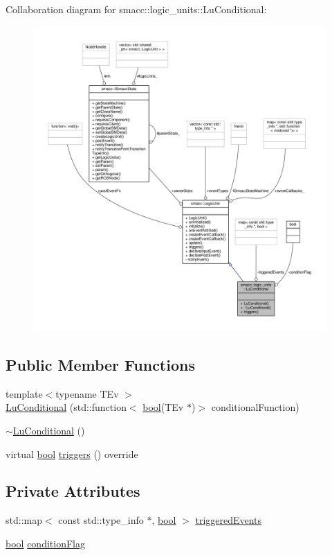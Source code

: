 Collaboration diagram for smacc\+:\+:logic\+\_\+units\+:\+:Lu\+Conditional\+:\nopagebreak
\begin{figure}[H]
\begin{center}
\leavevmode
\includegraphics[width=350pt]{classsmacc_1_1logic__units_1_1LuConditional__coll__graph}
\end{center}
\end{figure}
\subsection*{Public Member Functions}
\begin{DoxyCompactItemize}
\item 
{\footnotesize template$<$typename T\+Ev $>$ }\\\hyperlink{classsmacc_1_1logic__units_1_1LuConditional_a7e0cbc05104737037377b50371db5622}{Lu\+Conditional} (std\+::function$<$ \hyperlink{classbool}{bool}(T\+Ev $\ast$)$>$ conditional\+Function)
\item 
\hyperlink{classsmacc_1_1logic__units_1_1LuConditional_aff598f2b1271d15d06a309226145b241}{$\sim$\+Lu\+Conditional} ()
\item 
virtual \hyperlink{classbool}{bool} \hyperlink{classsmacc_1_1logic__units_1_1LuConditional_a6d2a5faf4a5fe8f7c9e2e3fdbc481f97}{triggers} () override
\end{DoxyCompactItemize}
\subsection*{Private Attributes}
\begin{DoxyCompactItemize}
\item 
std\+::map$<$ const std\+::type\+\_\+info $\ast$, \hyperlink{classbool}{bool} $>$ \hyperlink{classsmacc_1_1logic__units_1_1LuConditional_a506a426f93e02267406fa318dd370bf1}{triggered\+Events}
\item 
\hyperlink{classbool}{bool} \hyperlink{classsmacc_1_1logic__units_1_1LuConditional_a3467d1cd6e1801f892dbf8702539a707}{condition\+Flag}
\end{DoxyCompactItemize}
